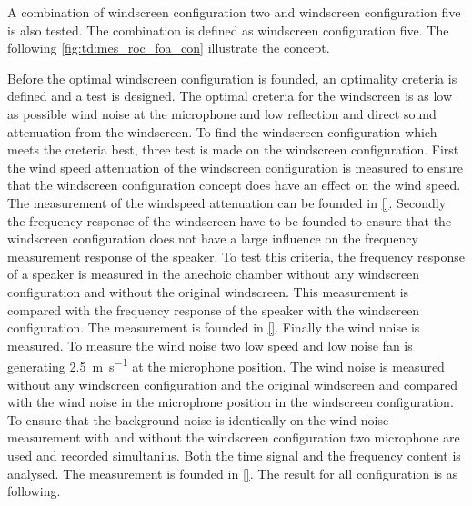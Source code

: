 

A combination of windscreen configuration two and windscreen configuration five is also tested. The combination is defined as windscreen configuration five. The following \autoref{fig:td:mes_roc_foa_con} illustrate the concept.



Before the optimal windscreen configuration is founded, an optimality creteria is defined and a test is designed. The optimal creteria for the windscreen is as low as possible wind noise at the microphone and low reflection and direct sound attenuation from the windscreen. To find the windscreen configuration which meets the creteria best, three test is made on the windscreen configuration. First the wind speed attenuation of the windscreen configuration is measured to ensure that the windscreen configuration concept does have an effect on the wind speed. The measurement of the windspeed attenuation can be founded in \autoref{}. Secondly the frequency response of the windscreen have to be founded to ensure that the windscreen configuration does not have a large influence on the frequency measurement response of the speaker. To test this criteria, the frequency response of a speaker is measured in the anechoic chamber without any windscreen configuration and without the original windscreen. This measurement is compared with the frequency response of the speaker with the windscreen configuration. The measurement is founded in \autoref{}. Finally the wind noise is measured. To measure the wind noise two low speed and low noise fan is generating \SI{2.5}{\meter\per\second} at the microphone position. The wind noise is measured without any windscreen configuration and the original windscreen and compared with the wind noise in the microphone position in the windscreen configuration. To ensure that the background noise is identically on the wind noise measurement with and without the windscreen configuration two microphone are used and recorded simultanius. Both the time signal and the frequency content is analysed. The measurement is founded in \autoref{}. The result for all configuration is as following.

